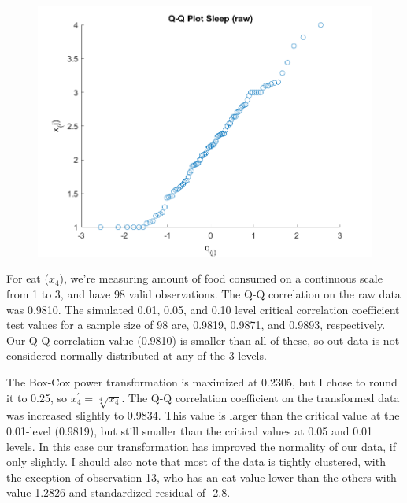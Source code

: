 \begin{center}
    \begin{figure}[H]
        \centering
        \includegraphics[scale=0.6]{./matlab/chapter-4/sol4.32.qq.3.png}
    \end{figure}
\end{center}

For eat ($x_{4}$), we're measuring amount of food consumed on a continuous scale from 1 to 3, and have 98 valid observations. The Q-Q correlation on the raw data was 0.9810. The simulated 0.01, 0.05, and 0.10 level critical correlation coefficient test values for a sample size of 98 are, 0.9819, 0.9871, and 0.9893, respectively. Our Q-Q correlation value (0.9810) is smaller than all of these, so out data is not considered normally distributed at any of the 3 levels.

The Box-Cox power transformation is maximized at 0.2305, but I chose to round it to 0.25, so $x_{4}^{\prime} = \sqrt[4]{x_{4}}$. The Q-Q correlation coefficient on the transformed data was increased slightly to 0.9834. This value is larger than the critical value at the 0.01-level (0.9819), but still smaller than the critical values at 0.05 and 0.01 levels. In this case our transformation has improved the normality of our data, if only slightly. I should also note that most of the data is tightly clustered, with the exception of observation 13, who has an eat value lower than the others with value 1.2826 and standardized residual of -2.8.

